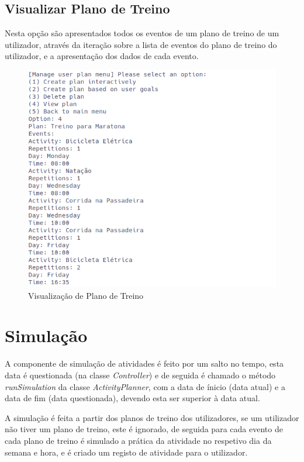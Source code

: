 \documentclass[a4paper,12pt]{scrreprt}
\begin{document}
    \clearpage
    \subsection{Visualizar Plano de Treino}
    Nesta opção são apresentados todos os eventos de um plano de treino de um utilizador,
    através da iteração sobre a lista de eventos do plano de treino do utilizador,
    e a apresentação dos dados de cada evento.

    \begin{figure}[!ht]
        \centering
        \includegraphics[width=\textwidth]{images/viewPlan.png}
        \caption{Visualização de Plano de Treino}
        \label{fig:view-plan}
    \end{figure}

\clearpage
\section{Simulação}
    \label{sec:simulacao}
    A componente de simulação de atividades é feito por um salto no tempo,
    esta data é questionada (na classe \textit{Controller}) e de seguida
    é chamado o método \textit{runSimulation} da classe \textit{ActivityPlanner},
    com a data de ínicio (data atual) e a data de fim (data questionada),
    devendo esta ser superior à data atual.

    A simulação é feita a partir dos planos de treino dos utilizadores,
    se um utilizador não tiver um plano de treino, este é ignorado,
    de seguida para cada evento de cada plano de treino é simulado a prática da atividade
    no respetivo dia da semana e hora, e é criado um registo de atividade para o utilizador.
\end{document}
